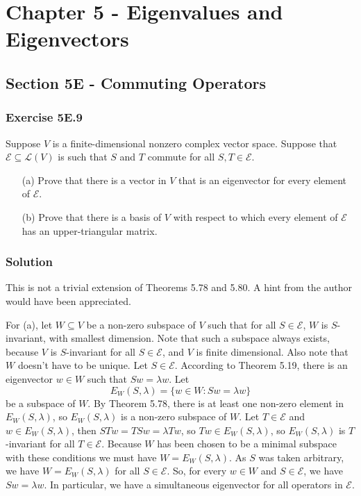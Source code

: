 \section*{Chapter 5 - Eigenvalues and Eigenvectors}

\subsection*{Section 5E - Commuting Operators}

\subsubsection*{Exercise 5E.9}

Suppose $V$ is a finite-dimensional nonzero complex vector space.
Suppose that $\mathcal{E} \subseteq \mathcal{L}(V)$ is such that $S$ and $T$ commute for all $S, T \in \mathcal{E}$.
\begin{itemize}
\item[(a)] Prove that there is a vector in $V$ that is an eigenvector for every element of $\mathcal{E}$.
\item[(b)] Prove that there is a basis of $V$ with respect to which every element of $\mathcal{E}$ has an upper-triangular matrix.
\end{itemize}

\subsubsection*{Solution}

This is not a trivial extension of Theorems 5.78 and 5.80.
A hint from the author would have been appreciated.

For (a), let $W \subseteq V$ be a non-zero subspace of $V$ such that for all $S \in \mathcal{E}$, $W$ is $S$-invariant, with smallest dimension.
Note that such a subspace always exists, because $V$ is $S$-invariant for all $S \in \mathcal{E}$, and $V$ is finite dimensional.
Also note that $W$ doesn't have to be unique.
Let $S \in \mathcal{E}$.
According to Theorem 5.19, there is an eigenvector $w \in W$ such that $Sw = \lambda w$.
Let
\begin{equation*}
    E_W(S, \lambda) = \{w \in W : Sw = \lambda w\}
\end{equation*}
be a subspace of $W$.
By Theorem 5.78, there is at least one non-zero element in $E_W(S, \lambda)$, so $E_W(S, \lambda)$ is a non-zero subspace of $W$.
Let $T \in \mathcal{E}$ and $w \in E_W(S, \lambda)$, then $STw = TSw = \lambda Tw$, so $Tw \in E_W(S, \lambda)$, so $E_W(S, \lambda)$ is $T$-invariant for all $T \in \mathcal{E}$.
Because $W$ has been chosen to be a minimal subspace with these conditions we must have $W = E_W(S, \lambda)$.
As $S$ was taken arbitrary, we have $W = E_W(S, \lambda)$ for all $S \in \mathcal{E}$.
So, for every $w \in W$ and $S \in \mathcal{E}$, we have $Sw = \lambda w$.
In particular, we have a simultaneous eigenvector for all operators in $\mathcal{E}$.
